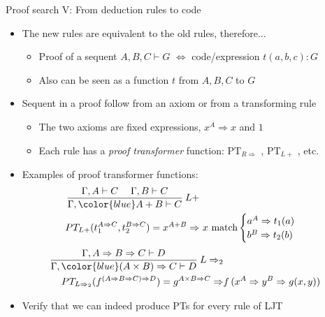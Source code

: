 \documentclass[english]{beamer}
\begin{document}
\begin{frame}{Proof search V: From deduction rules to code}

\begin{itemize}
\item The new rules are equivalent to the old rules, therefore...
\begin{itemize}
\item Proof of a sequent $A,B,C\vdash G$ $\Leftrightarrow$ code/expression
$t(a,b,c):G$
\item Also can be seen as a function $t$ from $A,B,C$ to $G$
\end{itemize}
\item Sequent in a proof follow from an axiom or from a transforming rule
\begin{itemize}
\item The two axioms are fixed expressions, $x^{A}\Rightarrow x$ and $1$
\item Each rule has a \emph{proof transformer} function: $\text{PT}_{R\Rightarrow}$
, $\text{PT}_{L+}$ , etc.
\end{itemize}
\item Examples of proof transformer functions:
\begin{align*}
\frac{\Gamma,A\vdash C\quad\;\Gamma,B\vdash C}{\Gamma,{\color{blue}A+B}\vdash C}\:L+\\
PT_{L+}(t_{1}^{A\Rightarrow C},t_{2}^{B\Rightarrow C})=x^{A+B}\Rightarrow & \ x\ \text{match}\begin{cases}
a^{A}\Rightarrow t_{1}(a)\\
b^{B}\Rightarrow t_{2}(b)
\end{cases}
\end{align*}
\begin{align*}
\frac{\Gamma,A\Rightarrow B\Rightarrow C\vdash D}{\Gamma,{\color{blue}(A\times B)\Rightarrow C}\vdash D}\:L\Rightarrow_{2}\\
PT_{L\Rightarrow_{2}}(f^{\left(A\Rightarrow B\Rightarrow C\right)\Rightarrow D})=g^{A\times B\Rightarrow C}\Rightarrow & f\,(x^{A}\Rightarrow y^{B}\Rightarrow g(x,y))
\end{align*}
\item Verify that we can indeed produce PTs for every rule of LJT
\end{itemize}
\end{frame}
\end{document}
